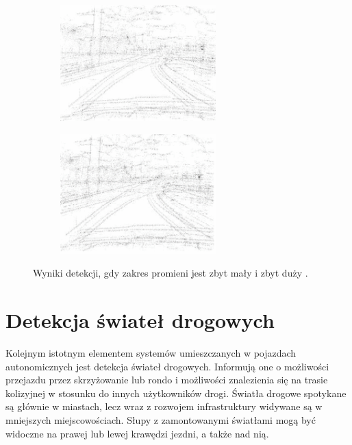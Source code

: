 
\begin{figure}[h]
	\centering
	\begin{subfigure}{0.35\textwidth}
		\centering
		\includegraphics[width=6cm]{img/znaki2.png}
		\subcaption{\label{fig:znaki2}}
	\end{subfigure}
	\begin{subfigure}{0.35\textwidth}
		\centering
		\includegraphics[width=6cm]{img/znaki3.png}
		\subcaption{\label{fig:znaki3}}
	\end{subfigure}
	
	\caption{\label{fig:details}Wyniki detekcji, gdy zakres promieni jest zbyt mały \protect{} i zbyt duży \protect{}.\cite{T2}}
\end{figure}

\section{Detekcja świateł drogowych}
\label{sec:tl}
Kolejnym istotnym elementem systemów umieszczanych w pojazdach autonomicznych jest detekcja świateł drogowych. Informują one o możliwości przejazdu przez skrzyżowanie lub rondo i możliwości znalezienia się na trasie kolizyjnej w stosunku do innych użytkowników drogi. Światła drogowe spotykane są głównie w miastach, lecz wraz z rozwojem infrastruktury widywane są w mniejszych miejscowościach. Słupy z zamontowanymi światłami mogą być widoczne na prawej lub lewej krawędzi jezdni, a także nad nią.

